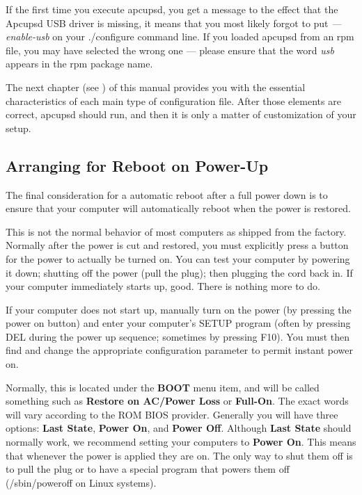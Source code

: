 If the first time you execute apcupsd, you get a message to the effect that
the Apcupsd USB driver is missing, it means that you most likely forgot to put
{\it {---}enable-usb} on your ./configure command line. If you loaded apcupsd
from an rpm file, you may have selected the wrong one {---} please ensure that
the word {\it usb} appears in the rpm package name.  

The next chapter (see 
) of this
manual provides you with the essential characteristics of each main type of
configuration file.  After those elements are correct, apcupsd should run, and
then it is only a matter of customization of your setup. 

\label{Arranging-for-Reboot-on-Power_002dUp}

\subsection*{Arranging for Reboot on Power-Up}

\label{index-Reboot-on-power-up-60}
\label{index-Power-up_002c-reboot-61}
The final consideration for a automatic reboot after a full power down is to
ensure that your computer will automatically reboot when the power is
restored.  

This is not the normal behavior of most computers as shipped from the factory.
Normally after the power is cut and restored, you must explicitly press a
button for the power to actually be turned on. You can test your computer by
powering it down; shutting off the power (pull the plug); then plugging the
cord back in. If your computer immediately starts up, good. There is nothing
more to do.  

If your computer does not start up, manually turn on the power (by pressing
the power on button) and enter your computer's SETUP program (often by
pressing DEL during the power up sequence; sometimes by pressing F10). You
must then find and change the appropriate configuration parameter to permit
instant power on.  

Normally, this is located under the {\bf BOOT} menu item, and will be called
something such as {\bf Restore on AC/Power Loss} or {\bf Full-On}. The exact
words will vary according to the ROM BIOS provider. Generally you will have
three options: {\bf Last State}, {\bf Power On}, and {\bf Power Off}. Although
{\bf Last State} should normally work, we recommend setting your computers to
{\bf Power On}. This means that whenever the power is applied they are on. The
only way to shut them off is to pull the plug or to have a special program
that powers them off (/sbin/poweroff on Linux systems).  


